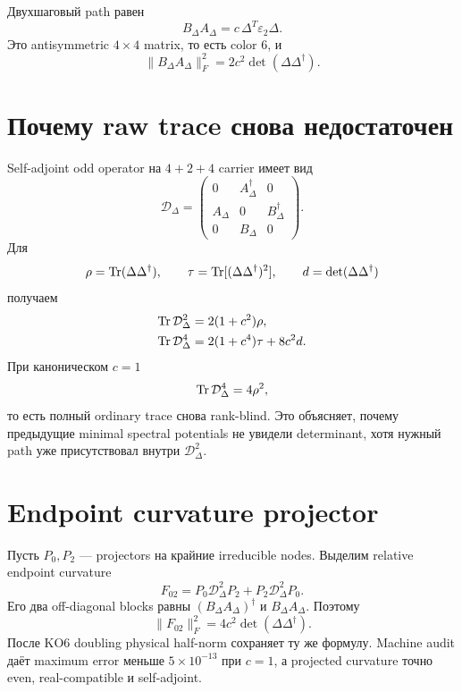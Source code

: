 Двухшаговый path равен
\begin{equation}
 B_\Delta A_\Delta
 =c\,\Delta^T\varepsilon_2\Delta.
 \label{eq:ps-valid-module-wedge}
\end{equation}
Это antisymmetric \(4\times4\) matrix, то есть color \(6\), и
\begin{equation}
 \|B_\Delta A_\Delta\|_F^2
 =2c^2\det(\Delta\Delta^\dagger).
 \label{eq:ps-valid-module-minor-norm}
\end{equation}

\section{Почему raw trace снова недостаточен}

Self-adjoint odd operator на \(4+2+4\) carrier имеет вид
\begin{equation}
 \mathcal D_\Delta=
 \begin{pmatrix}
 0&A_\Delta^\dagger&0\\
 A_\Delta&0&B_\Delta^\dagger\\
 0&B_\Delta&0
 \end{pmatrix}.
\end{equation}
Для
\begin{equation}
 \rho=\operatorname{Tr}(\Delta\Delta^\dagger),
 \qquad
 \tau=\operatorname{Tr}[(\Delta\Delta^\dagger)^2],
 \qquad
 d=\det(\Delta\Delta^\dagger)
\end{equation}
получаем
\begin{align}
 \operatorname{Tr}\mathcal D_\Delta^2
 &=2(1+c^2)\rho,\\
 \operatorname{Tr}\mathcal D_\Delta^4
 &=2(1+c^4)\tau+8c^2d.
 \label{eq:ps-valid-module-raw-traces}
\end{align}
При каноническом \(c=1\)
\begin{equation}
 \operatorname{Tr}\mathcal D_\Delta^4=4\rho^2,
\end{equation}
то есть полный ordinary trace снова rank-blind. Это объясняет, почему
предыдущие minimal spectral potentials не увидели determinant, хотя нужный
path уже присутствовал внутри \(\mathcal D_\Delta^2\).

\section{Endpoint curvature projector}

Пусть \(P_0,P_2\) --- projectors на крайние irreducible nodes. Выделим
relative endpoint curvature
\begin{equation}
 F_{02}
 =P_0\mathcal D_\Delta^2P_2
 +P_2\mathcal D_\Delta^2P_0.
 \label{eq:ps-endpoint-curvature}
\end{equation}
Его два off-diagonal blocks равны
\((B_\Delta A_\Delta)^\dagger\) и \(B_\Delta A_\Delta\). Поэтому
\begin{equation}
 \boxed{
 \|F_{02}\|_F^2
 =4c^2\det(\Delta\Delta^\dagger).}
 \label{eq:ps-projected-curvature-selector}
\end{equation}
После KO6 doubling physical half-norm сохраняет ту же формулу. Machine audit
даёт maximum error меньше \(5\times10^{-13}\) при \(c=1\), а projected
curvature точно even, real-compatible и self-adjoint.


